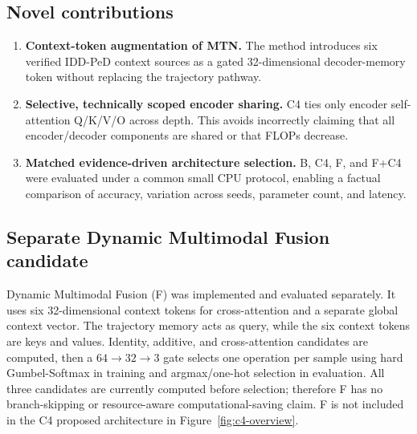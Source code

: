 \subsection{Novel contributions}
\begin{enumerate}[leftmargin=*,label=\textbf{C\arabic*.}]
\item \textbf{Context-token augmentation of MTN.} The method introduces six verified IDD-PeD context sources as a gated 32-dimensional decoder-memory token without replacing the trajectory pathway.
\item \textbf{Selective, technically scoped encoder sharing.} C4 ties only encoder self-attention Q/K/V/O across depth. This avoids incorrectly claiming that all encoder/decoder components are shared or that FLOPs decrease.
\item \textbf{Matched evidence-driven architecture selection.} B, C4, F, and F+C4 were evaluated under a common small CPU protocol, enabling a factual comparison of accuracy, variation across seeds, parameter count, and latency.
\end{enumerate}

\subsection{Separate Dynamic Multimodal Fusion candidate}
Dynamic Multimodal Fusion (F) was implemented and evaluated separately. It uses six 32-dimensional context tokens for cross-attention and a separate global context vector. The trajectory memory acts as query, while the six context tokens are keys and values. Identity, additive, and cross-attention candidates are computed, then a $64\rightarrow32\rightarrow3$ gate selects one operation per sample using hard Gumbel-Softmax in training and argmax/one-hot selection in evaluation. All three candidates are currently computed before selection; therefore F has no branch-skipping or resource-aware computational-saving claim. F is not included in the C4 proposed architecture in Figure~\ref{fig:c4-overview}.
